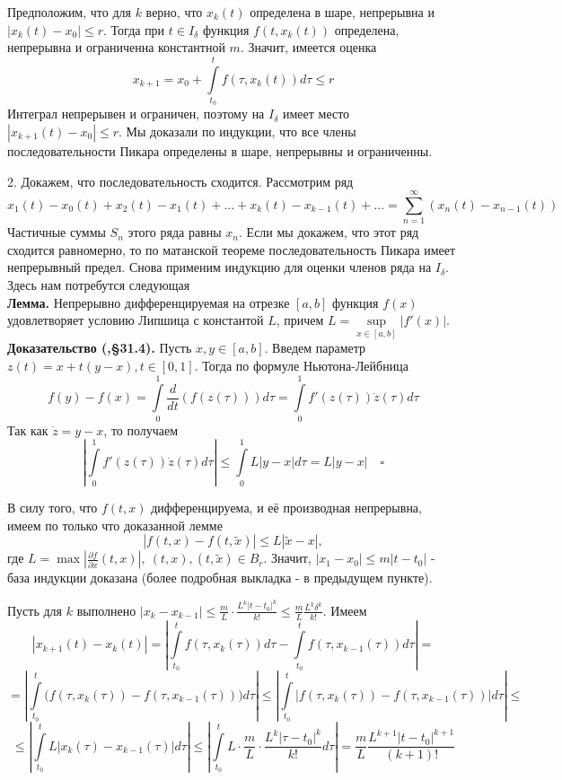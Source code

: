 Предположим, что для $k$ верно, что $x_k(t)$ определена в шаре, непрерывна и
$|x_k(t)-x_0|\leqslant r$. Тогда при $t\in I_\delta$ функция
$f(t,x_k(t))$ определена, непрерывна и ограниченна константной  $m$. Значит,
имеется оценка
$$x_{k+1}=x_0+
 \int\limits_{t_0}^{t}f(\tau,x_k(t))d\tau\leqslant  r$$
Интеграл непрерывен и ограничен, поэтому на $I_\delta$ имеет место
$|x_{k+1}(t)-x_0|\leqslant r$. Мы доказали по индукции, что все члены 
последовательности Пикара определены в шаре, непрерывны и ограниченны.

2. Докажем, что последовательность сходится. Рассмотрим ряд 
$$x_1(t)-x_0(t)+x_2(t)-x_1(t)+...+x_k(t)-x_{k-1}(t)+...=
\sum\limits_{n=1}^{\infty} (x_n(t)-x_{n-1}(t))$$
Частичные суммы $S_n$ этого ряда равны $x_n$. Если мы докажем, что этот
ряд сходится равномерно, то по матанской теореме последовательность Пикара 
имеет непрерывный предел. Снова применим индукцию для оценки членов ряда
на $I_\delta$. Здесь нам потребутся следующая\\
\textbf{Лемма.} Непрерывно дифференцируемая на отрезке $[a,b]$ функция $f(x)$  
удовлетворяет условию Липшица с константой $L$, причем  
$L=\sup\limits_{x\in [a,b]}|f'(x)|$.\\
\textbf{Доказательство (\cite{Arnold},\S31.4).} Пусть $x,y\in [a,b]$. 
Введем параметр $z(t)=x+t(y-x),t\in [0,1]$. Тогда по формуле 
Ньютона-Лейбница
$$f(y)-f(x)=\int\limits_{0}^{1}\frac{d}{dt}(f(z(\tau)))d\tau=
\int\limits_{0}^{1}f'(z(\tau))\dot z(\tau)d\tau$$ 
Так как $\dot z = y - x$, то получаем
$$\left| \int\limits_{0}^{1}f'(z(\tau))\dot z(\tau)d\tau\right|\leqslant 
\int\limits_{0}^{1}L|y-x|d\tau = L|y-x| \quad\square $$

В силу того, что $f(t,x)$ дифференцируема, и её производная непрерывна, имеем
по только что доказанной лемме
$$|f(t,x)-f(t,\tilde x)|\leqslant L|\tilde x-x|,$$
где $L=\max\left|\frac{\partial f}{\partial x}(t,x)\right|,~(t,x),
(t,\tilde x)\in B_r$. Значит, $|x_1-x_0|\leqslant m|t-t_0|$ - база 
индукции доказана (более подробная выкладка - в предыдущем пункте).  

Пусть для $k$ выполнено  $|x_{k}-x_{k-1}|\leqslant \frac{m}{L}\cdot 
\frac{L^k|t-t_0|^k}{k!} \leqslant \frac{m}{L}\frac{L^k\delta^k}{k!}$.
Имеем 
$$|x_{k+1}(t)-x_k(t)|= \left|\int\limits_{t_0}^{t}f(\tau,x_{k}(\tau))d\tau-
\int\limits_{t_0}^{t}f(\tau,x_{k-1}(\tau))d\tau\right| = $$
$$=
\left|\int\limits_{t_0}^{t}\big(f(\tau,x_{k}(\tau))-f(\tau,x_{k-1}(\tau))\big)
d\tau\right|\leqslant
 \left|\int\limits_{t_0}^{t}\big|f(\tau,x_{k}(\tau))-
f(\tau,x_{k-1}(\tau))\big|d\tau\right|\leqslant
$$
$$\leqslant 
\left| \int\limits_{t_0}^{t}L|x_{k}(\tau)-x_{k-1}(\tau)|d\tau\right|
\leqslant 
\left| \int\limits_{t_0}^{t} L\cdot \frac{m}{L}\cdot 
\frac{L^k|\tau-t_0|^k}{k!}   d\tau\right|
= \frac{m}{L}\frac{L^{k+1}|t-t_0|^{k+1}}{(k+1)!}
$$

